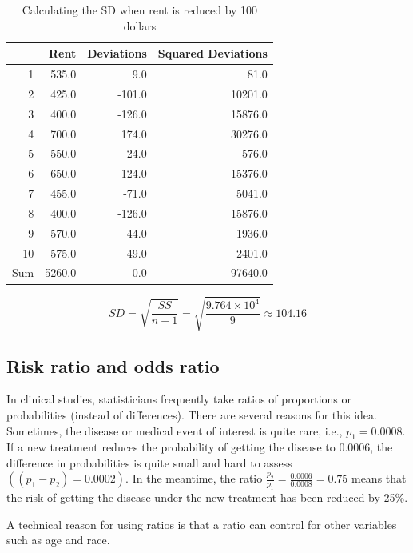 \documentclass[11pt, chapterprefix=true]{scrbook}\usepackage[]{graphicx}\usepackage[]{color}
\begin{document}
\begin{table}[ht]
\centering
\begin{tabular}{rrrr}
  \hline
 & Rent & Deviations & Squared Deviations \\ 
  \hline
1 & 535.0 & 9.0 & 81.0 \\ 
  2 & 425.0 & -101.0 & 10201.0 \\ 
  3 & 400.0 & -126.0 & 15876.0 \\ 
  4 & 700.0 & 174.0 & 30276.0 \\ 
  5 & 550.0 & 24.0 & 576.0 \\ 
  6 & 650.0 & 124.0 & 15376.0 \\ 
  7 & 455.0 & -71.0 & 5041.0 \\ 
  8 & 400.0 & -126.0 & 15876.0 \\ 
  9 & 570.0 & 44.0 & 1936.0 \\ 
  10 & 575.0 & 49.0 & 2401.0 \\ 
  Sum & 5260.0 & 0.0 & 97640.0 \\ 
   \hline
\end{tabular}
\caption{Calculating the SD when rent is reduced by 100 dollars} 
\end{table}



$$ SD = \sqrt{ \frac{ SS}{n - 1}} = \sqrt{ \frac{ \ensuremath{9.764\times 10^{4}}}{9}} \approx 104.16 $$



\subsection{Risk ratio and odds ratio}   %

 In clinical studies, statisticians frequently take ratios of proportions or probabilities (instead of differences).  There are several reasons for this idea.  Sometimes, the disease or medical event of interest is quite rare, i.e., $p_1 = 0.0008$.  If a new treatment reduces the probability of getting the disease to 0.0006, the difference in probabilities is quite small and hard to assess $((p_1 - p_2) = 0.0002)$.  In the meantime, the ratio $ \frac{p_2}{p_1} = \frac{0.0006}{0.0008} = 0.75 $ means that the risk of getting the disease under the new treatment has been reduced by 25\%.

A technical reason for using ratios is that a ratio can control for other variables such as age and race.
\end{document}
